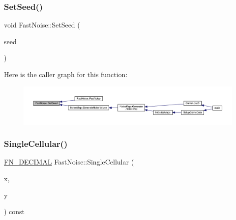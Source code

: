 \subsubsection{\texorpdfstring{Set\+Seed()}{SetSeed()}}
{\footnotesize\ttfamily void Fast\+Noise\+::\+Set\+Seed (\begin{DoxyParamCaption}\item[{int}]{seed }\end{DoxyParamCaption})}

Here is the caller graph for this function\+:
\nopagebreak
\begin{figure}[H]
\begin{center}
\leavevmode
\includegraphics[width=350pt]{d1/dd8/class_fast_noise_a2efb595ec8bc18541a3739c6bd9b7567_icgraph}
\end{center}
\end{figure}
\mbox{\label{class_fast_noise_a9729b73152368fb1c494bf4ab7cbe19e}} 
\subsubsection{\texorpdfstring{Single\+Cellular()}{SingleCellular()}\hspace{0.1cm}{\footnotesize\ttfamily [1/2]}}
{\footnotesize\ttfamily \mbox{\hyperlink{_fast_noise_8h_a75a9ef6d2541c4921815b885bfd449c3}{F\+N\+\_\+\+D\+E\+C\+I\+M\+AL}} Fast\+Noise\+::\+Single\+Cellular (\begin{DoxyParamCaption}\item[{\mbox{\hyperlink{_fast_noise_8h_a75a9ef6d2541c4921815b885bfd449c3}{F\+N\+\_\+\+D\+E\+C\+I\+M\+AL}}}]{x,  }\item[{\mbox{\hyperlink{_fast_noise_8h_a75a9ef6d2541c4921815b885bfd449c3}{F\+N\+\_\+\+D\+E\+C\+I\+M\+AL}}}]{y }\end{DoxyParamCaption}) const\hspace{0.3cm}{\ttfamily [private]}}

